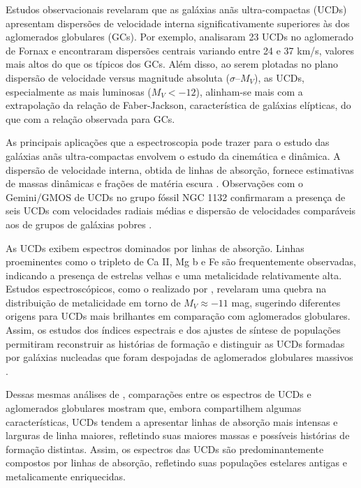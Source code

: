 Estudos observacionais revelaram que as galáxias anãs ultra-compactas (UCDs) apresentam dispersões de velocidade interna significativamente superiores às dos aglomerados globulares (GCs). Por exemplo, \cite{Mieske_2008_1} analisaram 23 UCDs no aglomerado de Fornax e encontraram dispersões centrais variando entre 24 e 37 km/s, valores mais altos do que os típicos dos GCs. Além disso, ao serem plotadas no plano dispersão de velocidade versus magnitude absoluta ($\sigma$–$M_V$), as UCDs, especialmente as mais luminosas ($M_V < -12$), alinham-se mais com a extrapolação da relação de Faber-Jackson, característica de galáxias elípticas, do que com a relação observada para GCs.

As principais aplicações que a espectroscopia pode trazer para o estudo das galáxias anãs ultra-compactas envolvem o estudo da cinemática e dinâmica. A dispersão de velocidade interna, obtida de linhas de absorção, fornece estimativas de massas dinâmicas e frações de matéria escura \citep{Chilingarian_2011}. Observações com o Gemini/GMOS de UCDs no grupo fóssil NGC 1132 confirmaram a presença de seis UCDs com velocidades radiais médias e dispersão de velocidades comparáveis aos de grupos de galáxias pobres \citep{Madrid_2013}.

As UCDs exibem espectros dominados por linhas de absorção. Linhas proeminentes como o tripleto de Ca II, Mg b e Fe são frequentemente observadas, indicando a presença de estrelas velhas e uma metalicidade relativamente alta. Estudos espectroscópicos, como o realizado por \cite{Mieske_2006}, revelaram uma quebra na distribuição de metalicidade em torno de $M_V \approx -11$ mag, sugerindo diferentes origens para UCDs mais brilhantes em comparação com aglomerados globulares. Assim, os estudos dos índices espectrais e dos ajustes de síntese de populações permitiram reconstruir as histórias de formação e distinguir as UCDs formadas por galáxias nucleadas que foram despojadas de aglomerados globulares massivos \citep{Mieske_2006}.

Dessas mesmas análises de \cite{Mieske_2006}, comparações entre os espectros de UCDs e aglomerados globulares mostram que, embora compartilhem algumas características, UCDs tendem a apresentar linhas de absorção mais intensas e larguras de linha maiores, refletindo suas maiores massas e possíveis histórias de formação distintas. Assim, os espectros das UCDs são predominantemente compostos por linhas de absorção, refletindo suas populações estelares antigas e metalicamente enriquecidas.

